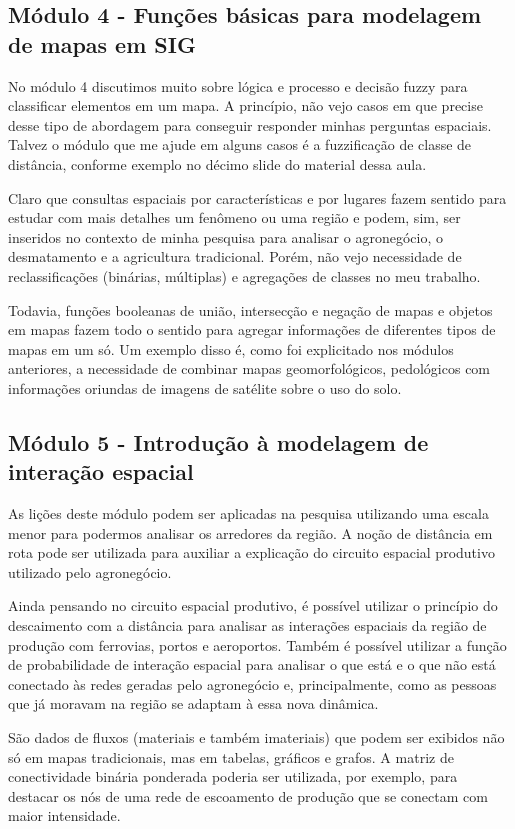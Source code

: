 \subsection{Módulo 4 - Funções básicas para modelagem de mapas em SIG}

No módulo 4 discutimos muito sobre lógica e processo e decisão fuzzy para classificar elementos em um mapa. A princípio, não vejo casos em que precise desse tipo de abordagem para conseguir responder minhas perguntas espaciais. Talvez o módulo que me ajude em alguns casos é a fuzzificação de classe de distância, conforme exemplo no décimo slide do material dessa aula.

Claro que consultas espaciais por características e por lugares fazem sentido para estudar com mais detalhes um fenômeno ou uma região e podem, sim, ser inseridos no contexto de minha pesquisa para analisar o agronegócio, o desmatamento e a agricultura tradicional. Porém, não vejo necessidade de reclassificações (binárias, múltiplas) e agregações de classes no meu trabalho.

Todavia, funções booleanas de união, intersecção e negação de mapas e objetos em mapas fazem todo o sentido para agregar informações de diferentes tipos de mapas em um só. Um exemplo disso é, como foi explicitado nos módulos anteriores, a necessidade de combinar mapas geomorfológicos, pedológicos com informações oriundas de imagens de satélite sobre o uso do solo.

\subsection{Módulo 5 - Introdução à modelagem de interação espacial}

As lições deste módulo podem ser aplicadas na pesquisa utilizando uma escala menor para podermos analisar os arredores da região. A noção de distância em rota pode ser utilizada para auxiliar a explicação do circuito espacial produtivo utilizado pelo agronegócio. 

Ainda pensando no circuito espacial produtivo, é possível utilizar o princípio do descaimento com a distância para analisar as interações espaciais da região de produção com ferrovias, portos e aeroportos. Também é possível utilizar a função de probabilidade de interação espacial para analisar o que está e o que não está conectado às redes geradas pelo agronegócio e, principalmente, como as pessoas que já moravam na região se adaptam à essa nova dinâmica.

São dados de fluxos (materiais e também imateriais) que podem ser exibidos não só em mapas tradicionais, mas em tabelas, gráficos e grafos. A matriz de conectividade binária ponderada poderia ser utilizada, por exemplo, para destacar os nós de uma rede de escoamento de produção que se conectam com maior intensidade.

